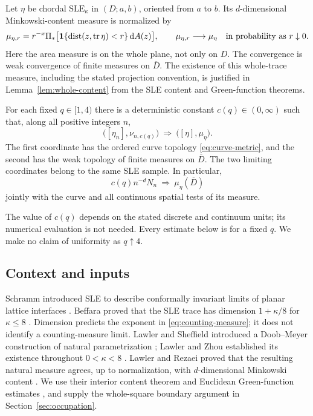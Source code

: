 Let $\eta$ be chordal $\mathrm{SLE}_\kappa$ in $(D;a,b)$, oriented
from $a$ to $b$. Its $d$-dimensional Minkowski-content measure is
normalized by
\begin{equation}\label{eq:content-measure}
 \mu_{\eta,r}
 =r^{-x}\Pi_*\bigl[
 \mathbf 1\{\operatorname{dist}(z,\operatorname{tr}\eta)<r\}\,\mathrm dA(z)\bigr],
 \qquad \mu_{\eta,r}\longrightarrow\mu_\eta
 \quad\text{in probability as }r\downarrow0.
\end{equation}
Here the area measure is on the whole plane, not only on $D$.
The convergence is weak convergence of finite measures on
$\overline D$. The existence of this whole-trace measure, including
the stated projection convention, is justified in
Lemma~\ref{lem:whole-content} from the SLE content and Green-function
theorems.

\begin{theorem}\label{thm:main}
For each fixed $q\in[1,4)$ there is a deterministic constant
$c(q)\in(0,\infty)$ such that, along all positive integers $n$,
\[
 \bigl([\eta_n],\nu_{n,c(q)}\bigr)
 \ \Longrightarrow\
 \bigl([\eta],\mu_\eta\bigr).
\]
The first coordinate has the ordered curve topology
\eqref{eq:curve-metric}, and the second has the weak topology of finite
measures on $\overline D$. The two limiting coordinates belong to the
same SLE sample. In particular,
\[
 c(q)n^{-d}N_n\ \Longrightarrow\ \mu_\eta(\overline D)
\]
jointly with the curve and all continuous spatial tests of its measure.
\end{theorem}

The value of $c(q)$ depends on the stated discrete and continuum units;
its numerical evaluation is not needed. Every estimate below is for a
fixed $q$. We make no claim of uniformity as $q\uparrow4$.

\subsection{Context and inputs}

Schramm introduced SLE to describe conformally invariant limits of
planar lattice interfaces \cite{Schramm}. Beffara proved that the SLE
trace has dimension $1+\kappa/8$ for $\kappa\le8$ \cite{Beffara}.
Dimension predicts the exponent in \eqref{eq:counting-measure}; it
does not identify a counting-measure limit. Lawler and Sheffield
introduced a Doob--Meyer construction of natural parametrization
\cite{LawlerSheffield}; Lawler and Zhou established its existence
throughout $0<\kappa<8$ \cite{LawlerZhou}. Lawler and Rezaei proved
that the resulting natural measure agrees, up to normalization, with
$d$-dimensional Minkowski content \cite{LawlerRezaeiContent}. We use
their interior content theorem and Euclidean Green-function estimates
\cite{LawlerRezaeiBasic}, and supply the whole-square boundary argument
in Section~\ref{sec:occupation}.


